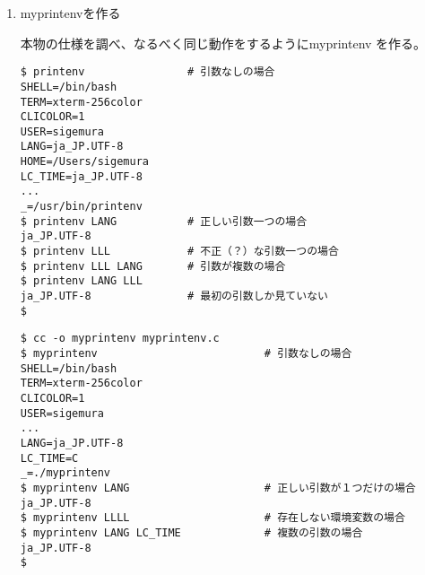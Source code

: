 \documentclass[a4j,dvipdfmx]{jarticle}
\begin{document}
\begin{enumerate}

\item myprintenvを作る

本物の仕様を調べ、なるべく同じ動作をするようにmyprintenv を作る。

\begin{lstlisting}[caption=本物のprintenvの仕様を確認する]
$ printenv                # 引数なしの場合
SHELL=/bin/bash
TERM=xterm-256color
CLICOLOR=1
USER=sigemura
LANG=ja_JP.UTF-8
HOME=/Users/sigemura
LC_TIME=ja_JP.UTF-8
...
_=/usr/bin/printenv
$ printenv LANG           # 正しい引数一つの場合
ja_JP.UTF-8
$ printenv LLL            # 不正（？）な引数一つの場合
$ printenv LLL LANG       # 引数が複数の場合
$ printenv LANG LLL
ja_JP.UTF-8               # 最初の引数しか見ていない
$
\end{lstlisting}



\begin{lstlisting}[caption=myprintenvの動作確認]
$ cc -o myprintenv myprintenv.c 
$ myprintenv                          # 引数なしの場合
SHELL=/bin/bash
TERM=xterm-256color
CLICOLOR=1
USER=sigemura
...
LANG=ja_JP.UTF-8
LC_TIME=C
_=./myprintenv
$ myprintenv LANG                     # 正しい引数が１つだけの場合
ja_JP.UTF-8
$ myprintenv LLLL                     # 存在しない環境変数の場合
$ myprintenv LANG LC_TIME             # 複数の引数の場合
ja_JP.UTF-8
$
\end{lstlisting}

\end{enumerate}
\end{document}
